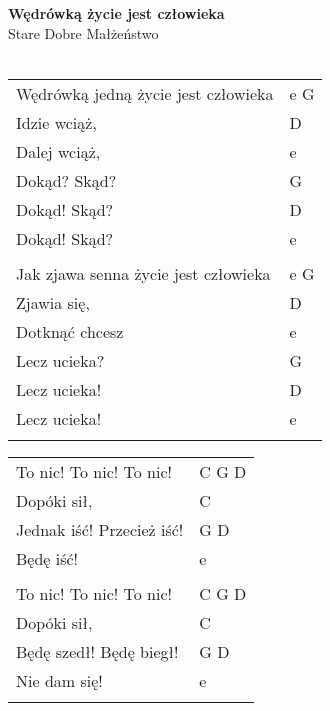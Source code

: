 \documentclass[a5paper]{article}
\begin{document}


\noindent
\fontsize{12pt}{15pt}\selectfont
\textbf{Wędrówką życie jest człowieka} \\
\fontsize{8pt}{10pt}\selectfont
Stare Dobre Małżeństwo \\ \\
\fontsize{10pt}{12pt}\selectfont
{}
\begin{tabular}{@{}p{7.50cm}p{3cm}@{}}
\noindent
Wędrówką jedną życie jest człowieka & e G \\
Idzie wciąż, & D \\
Dalej wciąż, & e \\
Dokąd? Skąd? & G \\
Dokąd! Skąd? & D \\
Dokąd! Skąd? & e \\ \\

Jak zjawa senna życie jest człowieka & e G \\
Zjawia się, & D \\
Dotknąć chcesz & e \\
Lecz ucieka? & G \\
Lecz ucieka! & D \\
Lecz ucieka! & e \\ \\
\end{tabular}

\noindent
\begin{tabular}{@{}p{6.50cm}p{3cm}@{}}
To nic! To nic! To nic! & C G D \\
Dopóki sił, & C \\
Jednak iść! Przecież iść! & G D \\
Będę iść! & e \\ \\

To nic! To nic! To nic! & C G D \\
Dopóki sił, & C \\
Będę szedł! Będę biegł! & G D \\
Nie dam się! & e \\ \\
\end{tabular}
\end{document}
